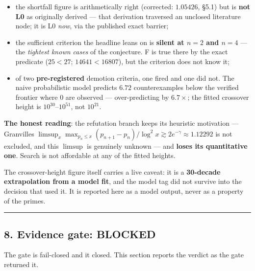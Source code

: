 \documentclass[
  a4paper,
  11pt]{article}
\providecommand{\tightlist}{%
  \setlength{\itemsep}{0pt}\setlength{\parskip}{0pt}}
\begin{document}
\begin{itemize}
\tightlist
\item
  the shortfall figure is arithmetically right (corrected: \(1.05426\),
  §5.1) but is \textbf{not L0} as originally derived --- that derivation
  traversed an unclosed literature node; it is L0 \emph{now}, via the
  published exact barrier;
\item
  the sufficient criterion the headline leans on is \textbf{silent at
  \(n = 2\) and \(n = 4\)} --- the \emph{tightest known cases} of the
  conjecture. F is true there by the exact predicate (\(25 < 27\);
  \(14641 < 16807\)), but the criterion does not know it;
\item
  of two \textbf{pre-registered} demotion criteria, one fired and one
  did not. The naive probabilistic model predicts \(6.72\)
  counterexamples below the verified frontier where \(0\) are observed
  --- over-predicting by \(6.7\times\); the fitted crossover height is
  \(10^{30}\)--\(10^{51}\), not \(10^{21}\).
\end{itemize}

\textbf{The honest reading}: the refutation branch keeps its heuristic
motivation --- Granville\textquotesingle s
\(\limsup_{x} \max_{p_n \le x}(p_{n+1}-p_n)/\log^2 x \gtrsim 2e^{-\gamma} \approx 1.12292\)
is not excluded, and this \(\limsup\) is genuinely unknown --- and
\textbf{loses its quantitative one}. Search is not affordable at any of
the fitted heights.

The crossover-height figure itself carries a live caveat: it is a
\textbf{30-decade extrapolation from a model fit}, and the model tag did
not survive into the decision that used it. It is reported here as a
model output, never as a property of the primes.

\begin{center}\rule{0.5\linewidth}{0.5pt}\end{center}

\subsection{8. Evidence gate: BLOCKED}\label{8-evidence-gate-blocked}

The gate is fail-closed and it closed. This section reports the verdict
as the gate returned it.
\end{document}
